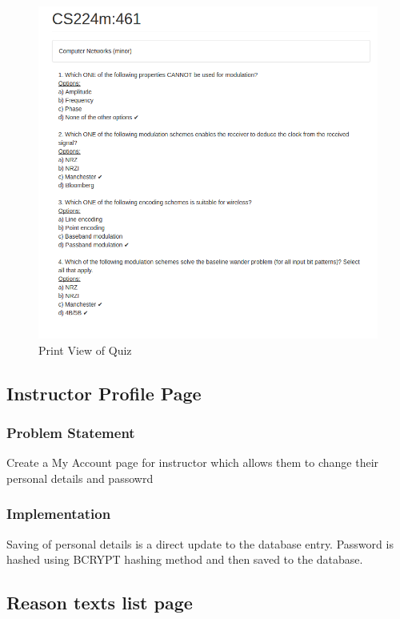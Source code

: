 \begin{figure}[h!]
\begin{center}
\includegraphics[scale=.4]{diagrams/print-view} 
\vspace{1cm}
\caption{Print View of Quiz}
\end{center}
\end{figure}

\subsection{Instructor Profile Page}
\subsubsection{Problem Statement}
	Create a My Account page for instructor which allows them to change their personal details and passowrd

\subsubsection{Implementation}
	Saving of personal details is a direct update to the database entry. Password is hashed using BCRYPT hashing method and then saved to the database. 

\subsection{Reason texts list page}
